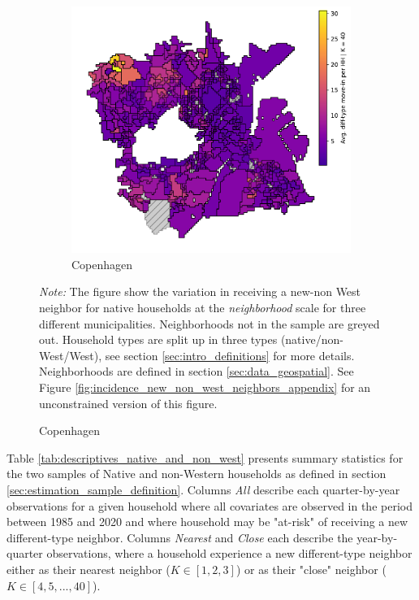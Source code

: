\documentclass[main.tex]{subfiles}
\begin{document}
\begin{figure}
    \begin{subfigure}{.65\textwidth}	
	\centering
	\includegraphics[width=\textwidth]{figs/cph_howdy_neighbor_sample.pdf}	
	\caption{Copenhagen} \label{fig:incidence_different_type_cph}
	\end{subfigure}	
\begin{tablenotes}
\item \footnotesize \textit{Note:} The figure show the variation in receiving a new-non West neighbor for native households at the \textit{neighborhood} scale for three different municipalities. Neighborhoods not in the sample are greyed out. Household types are split up in three types (native/non-West/West), see section \ref{sec:intro_definitions} for more details. Neighborhoods are defined in section \ref{sec:data_geospatial}. See Figure \ref{fig:incidence_new_non_west_neighbors_appendix} for an unconstrained version of this figure.
\end{tablenotes}
\label{fig:incidence_new_non_west_neighbors}
\end{figure}

\newpage
Table \ref{tab:descriptives_native_and_non_west} presents summary statistics for the two samples of Native and non-Western households as defined in section \ref{sec:estimation_sample_definition}. Columns \textit{All} describe each quarter-by-year observations for a given household where all covariates are observed in the period between 1985 and 2020 and where household may be "at-risk" of receiving a new different-type neighbor. Columns \textit{Nearest} and \textit{Close} each describe the year-by-quarter observations, where a household experience a new different-type neighbor either as their nearest neighbor ($K\in [1,2, 3]$) or as their "close" neighbor ($K \in [4,5, ..., 40]$).
\end{document}

